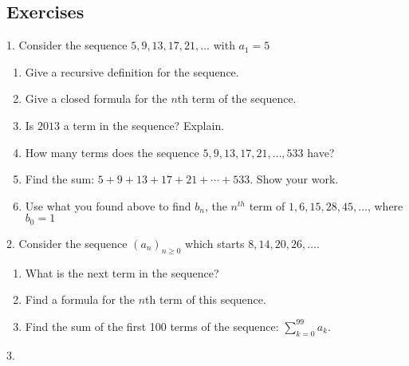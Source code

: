 \documentclass[12pt,]{book}
\theoremstyle{plain}
\theoremstyle{definition}
\theoremstyle{definition}
\theoremstyle{definition}
\numberwithin{equation}{chapter}
\begin{document}
\subsection*{Exercises}\label{exercises_seq-arithgeom}
\begin{exerciselist}
\item[1.]\hypertarget{exercise-10}{}\hypertarget{p-169}{}%
Consider the sequence \(5, 9, 13, 17, 21, \ldots\) with \(a_1 = 5\)%
\par
\hypertarget{p-170}{}%
\leavevmode%
\begin{enumerate}[label=(\alph*)]
\item\hypertarget{li-93}{}\hypertarget{p-171}{}%
Give a recursive definition for the sequence.%
\item\hypertarget{li-94}{}\hypertarget{p-172}{}%
Give a closed formula for the \(n\)th term of the sequence.%
\item\hypertarget{li-95}{}\hypertarget{p-173}{}%
Is \(2013\) a term in the sequence? Explain.%
\item\hypertarget{li-96}{}\hypertarget{p-174}{}%
How many terms does the sequence \(5, 9, 13, 17, 21, \ldots, 533\) have?%
\item\hypertarget{li-97}{}\hypertarget{p-175}{}%
Find the sum: \(5 + 9 + 13 + 17 + 21 + \cdots + 533\). Show your work.%
\item\hypertarget{li-98}{}\hypertarget{p-176}{}%
Use what you found above to find \(b_n\), the \(n^{th}\) term of \(1, 6, 15, 28, 45, \ldots\), where \(b_0 = 1\)%
\end{enumerate}
%
\par\smallskip
\item[2.]\hypertarget{exercise-11}{}\hypertarget{p-180}{}%
Consider the sequence \((a_n)_{n \ge 0}\) which starts \(8, 14, 20, 26, \ldots\).%
\par
\hypertarget{p-181}{}%
\leavevmode%
\begin{enumerate}[label=(\alph*)]
\item\hypertarget{li-105}{}\hypertarget{p-182}{}%
What is the next term in the sequence?%
\item\hypertarget{li-106}{}\hypertarget{p-183}{}%
Find a formula for the \(n\)th term of this sequence.%
\item\hypertarget{li-107}{}\hypertarget{p-184}{}%
Find the sum of the first 100 terms of the sequence: \(\sum_{k=0}^{99}a_k\).%
\end{enumerate}
%
\par\smallskip
\item[3.]\hypertarget{exercise-12}{}\hypertarget{p-187}{}%

\end{exerciselist}
\end{document}
